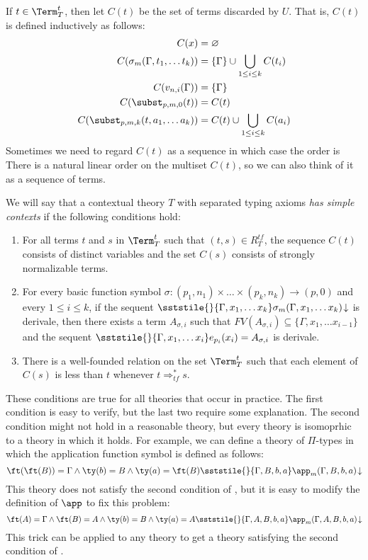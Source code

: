 If $t \in \Term_T^t$, then let $C(t)$ be the set of terms discarded by $U$.
That is, $C(t)$ is defined inductively as follows:
\begin{align*}
C(x) & = \varnothing \\
C(\sigma_m(\Gamma, t_1, \ldots t_k)) & = \{ \Gamma \} \cup \bigcup_{1 \leq i \leq k} C(t_i) \\
C(v_{n,i}(\Gamma)) & = \{ \Gamma \} \\
C(\subst_{p,m,0}(t)) & = C(t) \\
C(\subst_{p,m,k}(t, a_1, \ldots a_k)) & = C(t) \cup \bigcup_{1 \leq i \leq k} C(a_i)
\end{align*}
Sometimes we need to regard $C(t)$ as a sequence in which case the order is 
There is a natural linear order on the multiset $C(t)$, so we can also think of it as a sequence of terms.

\begin{defn}
We will say that a contextual theory $T$ with separated typing axioms \emph{has simple contexts} if the following conditions hold:
\begin{enumerate}
\item For all terms $t$ and $s$ in $\Term_T^t$ such that $(t,s) \in R^{tf}_T$, the sequence $C(t)$ consists of distinct variables and the set $C(s)$ consists of strongly normalizable terms.
\item For every basic function symbol $\sigma : (p_1,n_1) \times \ldots \times (p_k,n_k) \to (p,0)$ and every $1 \leq i \leq k$,
if the sequent $\sststile{}{\Gamma, x_1, \ldots x_k} \sigma_m(\Gamma, x_1, \ldots x_k)\!\downarrow$ is derivale,
then there exists a term $A_{\sigma,i}$ such that $FV(A_{\sigma,i}) \subseteq \{ \Gamma, x_1, \ldots x_{i-1} \}$ and the sequent $\sststile{}{\Gamma, x_1, \ldots x_i} e_{p_i}(x_i) = A_{\sigma,i}$ is derivale.
\item There is a well-founded relation on the set $\Term_T^t$ such that each element of $C(s)$ is less than $t$ whenever $t \Rightarrow_{tf}^* s$.
\end{enumerate}
\end{defn}
These conditions are true for all theories that occur in practice.
The first condition is easy to verify, but the last two require some explanation.
The second condition might not hold in a reasonable theory, but every theory is isomoprhic to a theory in which it holds.
For example, we can define a theory of $\Pi$-types in which the application function symbol is defined as follows:
\[ \ft(\ft(B)) = \Gamma \land \ty(b) = B \land \ty(a) = \ft(B) \sststile{}{\Gamma,B,b,a} \app_m(\Gamma,B,b,a)\!\downarrow \]
This theory does not satisfy the second condition of , but it is easy to modify the definition of $\app$ to fix this problem:
\[ \ft(A) = \Gamma \land \ft(B) = A \land \ty(b) = B \land \ty(a) = A \sststile{}{\Gamma,A,B,b,a} \app_m(\Gamma,A,B,b,a)\!\downarrow \]
This trick can be applied to any theory to get a theory satisfying the second condition of .

